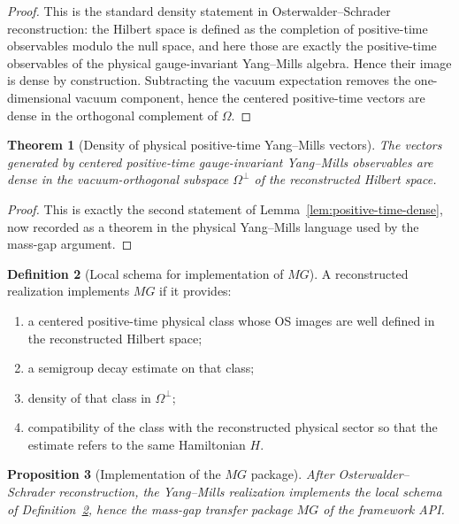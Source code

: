 \documentclass[11pt]{article}
\newtheorem{theorem}{Theorem}[section]
\newtheorem{proposition}[theorem]{Proposition}
\theoremstyle{definition}
\newtheorem{definition}[theorem]{Definition}
\theoremstyle{remark}
\begin{document}
\begin{proof}
This is the standard density statement in Osterwalder--Schrader
reconstruction: the Hilbert space is defined as the completion of positive-time
observables modulo the null space, and here those are exactly the positive-time
observables of the physical gauge-invariant Yang--Mills algebra.  Hence their
image is dense by construction.
Subtracting the vacuum expectation removes the one-dimensional vacuum component,
hence the centered positive-time vectors are dense in the orthogonal complement
of $\Omega$.
\end{proof}

\begin{theorem}[Density of physical positive-time Yang--Mills vectors]
\label{thm:physical-positive-time-density}
The vectors generated by centered positive-time gauge-invariant Yang--Mills
observables are dense in the vacuum-orthogonal subspace \(\Omega^\perp\) of
the reconstructed Hilbert space.
\end{theorem}

\begin{proof}
This is exactly the second statement of
Lemma~\ref{lem:positive-time-dense}, now recorded as a theorem in the
physical Yang--Mills language used by the mass-gap argument.
\end{proof}

\begin{definition}[Local schema for implementation of \(MG\)]
\label{def:api-mg-schema}
A reconstructed realization implements \(MG\) if it provides:
\begin{enumerate}[label=\textnormal{(MG\arabic*)},leftmargin=1.5em]
\item a centered positive-time physical class whose OS images are well defined
in the reconstructed Hilbert space;
\item a semigroup decay estimate on that class;
\item density of that class in \(\Omega^\perp\);
\item compatibility of the class with the reconstructed physical sector so that
the estimate refers to the same Hamiltonian \(H\).
\end{enumerate}
\end{definition}

\begin{proposition}[Implementation of the \(MG\) package]
\label{prop:api-mg}
After Osterwalder--Schrader reconstruction, the Yang--Mills realization
implements the local schema of Definition~\ref{def:api-mg-schema}, hence the
mass-gap transfer package \(MG\) of the framework API.
\end{proposition}
\end{document}
